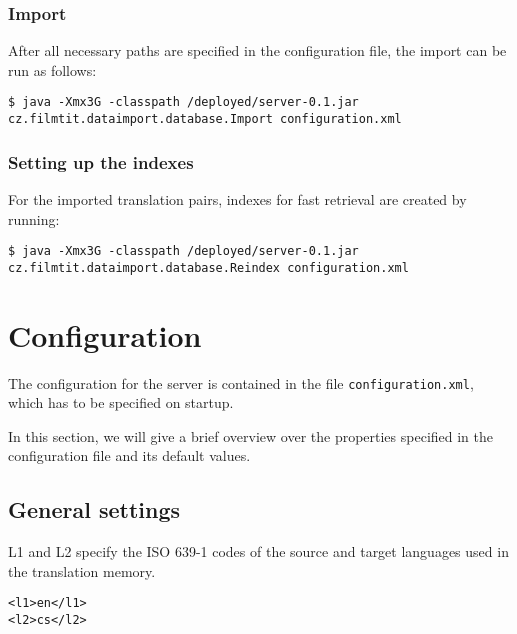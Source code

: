\todo{!}


\subsubsection{Import}

After all necessary paths are specified in the configuration file, the import can be run as follows:

\vspace*{0.5em}
\begin{lstlisting}
$ java -Xmx3G -classpath /deployed/server-0.1.jar cz.filmtit.dataimport.database.Import configuration.xml
\end{lstlisting}
\vspace*{0.5em}


\subsubsection{Setting up the indexes}

For the imported translation pairs, indexes for fast retrieval are created by running:

\vspace*{0.5em}
\begin{lstlisting}
$ java -Xmx3G -classpath /deployed/server-0.1.jar cz.filmtit.dataimport.database.Reindex configuration.xml
\end{lstlisting}
\vspace*{0.5em}




\section{Configuration}
\label{sec:config}

The configuration for the server is contained in the file \verb#configuration.xml#, which has to be specified on startup.

In this section, we will give a brief overview over the properties specified in the configuration file and its default values.

\subsection{General settings}
L1 and L2 specify the ISO 639-1 codes of the source and target languages used in the translation memory.
\begin{lstlisting}
<l1>en</l1>
<l2>cs</l2>
\end{lstlisting}

